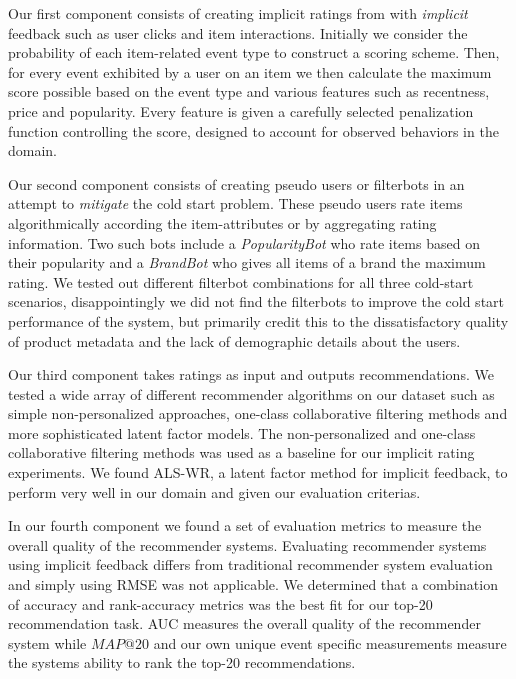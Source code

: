 Our first component consists of creating implicit ratings from with
\textit{implicit} feedback such as user clicks and item interactions. Initially
we consider the probability of each item-related event type to construct a
scoring scheme. Then, for every event exhibited by a user on an item we then
calculate the maximum score possible based on the event type and various
features such as recentness, price and popularity. Every feature is given a
carefully selected penalization function controlling the score, designed to
account for observed behaviors in the domain.

Our second component consists of creating pseudo users or filterbots in an
attempt to \textit{mitigate} the cold start problem. These pseudo users rate
items algorithmically according the item-attributes or by aggregating rating
information. Two such bots include a \textit{PopularityBot} who rate items
based on their popularity and a \textit{BrandBot} who gives all items of a
brand the maximum rating. We tested out different filterbot combinations for
all three cold-start scenarios, disappointingly we did not find the filterbots
to improve the cold start performance of the system, but primarily credit this
to the dissatisfactory quality of product metadata and the lack of demographic
details about the users.

Our third component takes ratings as input and outputs
recommendations. We tested a wide array of different recommender algorithms on
our dataset such as simple non-personalized approaches, one-class collaborative
filtering methods and more sophisticated latent factor models. The
non-personalized and one-class collaborative filtering methods was used as a
baseline for our implicit rating experiments. We found ALS-WR, a latent factor
method for implicit feedback, to perform very well in our domain and given our
evaluation criterias.

In our fourth component we found a set of evaluation metrics to measure the
overall quality of the recommender systems. Evaluating recommender systems
using implicit feedback differs from traditional recommender system evaluation
and simply using RMSE was not applicable. We determined that a combination of
accuracy and rank-accuracy metrics was the best fit for our top-20
recommendation task.  AUC measures the overall quality of the recommender
system while $MAP@20$ and our own unique event specific measurements measure
the systems ability to rank the top-20 recommendations.

